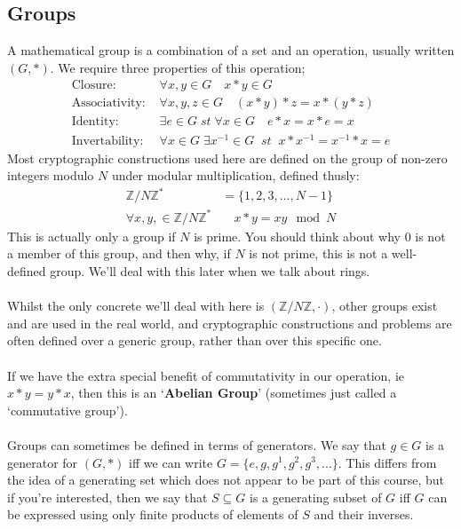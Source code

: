    \subsection{Groups}
    A mathematical group is a combination of a set and an operation, usually written $(G,*)$. We require three properties of this operation;
	\begin{align*}
		\mbox{Closure: } &\forall x,y \in G \quad x*y \in G\\
		\mbox{Associativity: } &\forall x,y,z \in G \quad (x*y)*z = x*(y*z)\\
		\mbox{Identity: } &\exists e \in G \; st \; \forall x \in G \quad e*x = x*e = x \\
		\mbox{Invertability: } &\forall x \in G \; \exists x^{-1} \in G \;\; st \;\; x*x^{-1} = x^{-1} * x = e
	\end{align*}
	Most cryptographic constructions used here are defined on the group of non-zero integers modulo $N$ under modular multiplication, defined thusly:
    \begin{align*}
        \mathbb{Z}/N\mathbb{Z}^{*} &= \{1, 2, 3, ... , N-1\} \\
        \forall x,y, \in \mathbb{Z}/N\mathbb{Z}^{*}& \quad x * y = xy \mod N
    \end{align*}
    This is actually only a group if $N$ is prime. You should think about why $0$ is not a member of this group, and then why, if $N$ is not prime, this is not a well-defined group. We'll deal with this later when we talk about rings.\\
\\
	Whilst the only concrete we'll deal with here is $(\mathbb{Z}/N\mathbb{Z} , \cdot)$, other groups exist and are used in the real world, and cryptographic constructions and problems are often defined over a generic group, rather than over this specific one.\\
\\
	If we have the extra special benefit of commutativity in our operation, ie $x*y = y*x$, then this is an `\textbf{Abelian Group}' (sometimes just called a `commutative group').\\
\\
    Groups can sometimes be defined in terms of generators. We say that $g \in G$ is a generator for $(G,*)$ iff we can write $G = \{e,g,g^1,g^2,g^3,...\}$. This differs from the idea of a generating set which does not appear to be part of this course, but if you're interested, then we say that $S\subseteq G$ is a generating subset of $G$ iff $G$ can be expressed using only finite products of elements of $S$ and their inverses.

